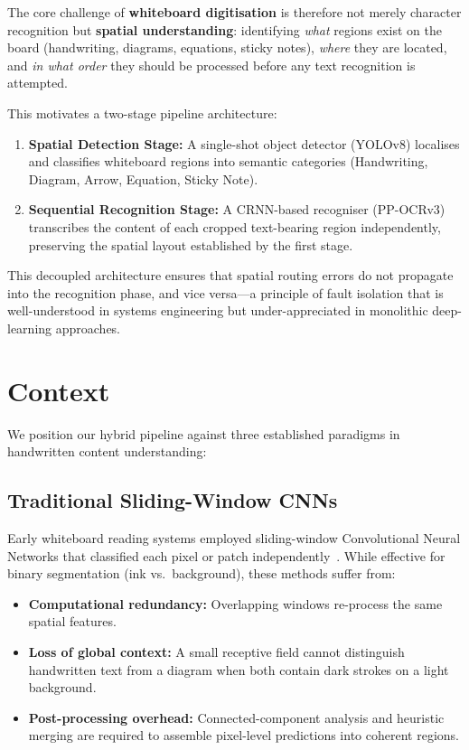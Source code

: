 \documentclass[11pt, a4paper]{article}
\begin{document}
The core challenge of \textbf{whiteboard digitisation} is therefore not merely character recognition but \textbf{spatial understanding}: identifying \emph{what} regions exist on the board (handwriting, diagrams, equations, sticky notes), \emph{where} they are located, and \emph{in what order} they should be processed before any text recognition is attempted.

This motivates a two-stage pipeline architecture:
\begin{enumerate}[label=\arabic*.]
  \item \textbf{Spatial Detection Stage:} A single-shot object detector (YOLOv8) localises and classifies whiteboard regions into semantic categories (Handwriting, Diagram, Arrow, Equation, Sticky Note).
  \item \textbf{Sequential Recognition Stage:} A CRNN-based recogniser (PP-OCRv3) transcribes the content of each cropped text-bearing region independently, preserving the spatial layout established by the first stage.
\end{enumerate}

This decoupled architecture ensures that spatial routing errors do not propagate into the recognition phase, and vice versa—a principle of fault isolation that is well-understood in systems engineering but under-appreciated in monolithic deep-learning approaches.


\section{Context}\label{sec:context}

We position our hybrid pipeline against three established paradigms in handwritten content understanding:

\subsection{Traditional Sliding-Window CNNs}
Early whiteboard reading systems employed sliding-window Convolutional Neural Networks that classified each pixel or patch independently~\cite{kota2014whiteboard}. While effective for binary segmentation (ink vs.\ background), these methods suffer from:
\begin{itemize}
  \item \textbf{Computational redundancy:} Overlapping windows re-process the same spatial features.
  \item \textbf{Loss of global context:} A small receptive field cannot distinguish handwritten text from a diagram when both contain dark strokes on a light background.
  \item \textbf{Post-processing overhead:} Connected-component analysis and heuristic merging are required to assemble pixel-level predictions into coherent regions.
\end{itemize}
\end{document}
